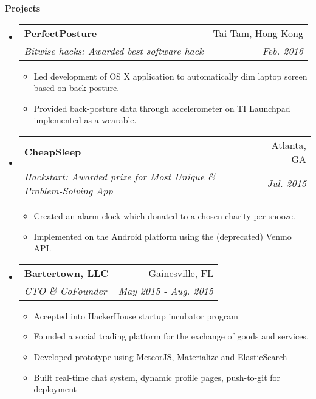\documentclass[letterpaper,10pt]{article}
\makeatletter
\newcommand{\resitem}[1]{\item #1 \vspace{-2pt}}
\newcommand{\resheading}[1]{{\large \colorbox{mygrey}{\begin{minipage}{\textwidth}{\textbf{#1 \vphantom{p\^{E}}}}\end{minipage}}}}
\newcommand{\ressubheading}[4]{
\begin{tabular*}{7.0in}{l@{\extracolsep{\fill}}r}
		\textbf{#1} & #2 \\
		\textit{#3} & \textit{#4} \\
\end{tabular*}\vspace{-6pt}}
\makeatother
\begin{document}
\resheading{Projects}
\begin{itemize}
\item
	\ressubheading{PerfectPosture}{Tai Tam, Hong Kong}{Bitwise hacks: Awarded best software hack}{Feb. 2016}
	\begin{itemize}
		\resitem{Led development of OS X application to automatically dim laptop screen based on back-posture.}
		\resitem{Provided back-posture data through accelerometer on TI Launchpad implemented as a wearable.}
	\end{itemize}
\item
	\ressubheading{CheapSleep}{Atlanta, GA}{Hackstart: Awarded prize for Most Unique \& Problem-Solving App}{Jul. 2015}
	\begin{itemize}
		\resitem{Created an alarm clock which donated to a chosen charity per snooze.}
		\resitem{Implemented on the Android platform using the (deprecated) Venmo API.}
	\end{itemize}
\item
	\ressubheading{Bartertown, LLC}{Gainesville, FL}{CTO \& CoFounder}{May 2015 - Aug. 2015}
	\begin{itemize}
		\resitem{Accepted into HackerHouse startup incubator program}
		\resitem{Founded a social trading platform for the exchange of goods and services.}
		\resitem{Developed prototype using MeteorJS, Materialize and ElasticSearch}
		\resitem{Built real-time chat system, dynamic profile pages, push-to-git for deployment}
	\end{itemize}

\end{itemize}

\end{document}
